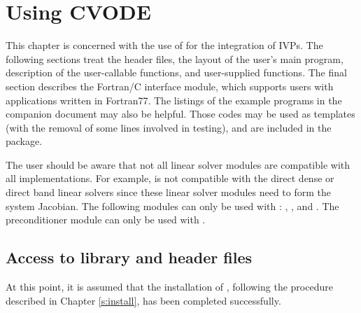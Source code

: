 \chapter{Using CVODE}\label{s:simulation}

This chapter is concerned with the use of {\cvode} for the integration
of IVPs.  The following sections treat the header files, the layout of
the user's main program, description of the {\cvode} user-callable
functions, and user-supplied functions.  The final section describes
the Fortran/C interface module, which supports users with applications
written in Fortran77.  The listings of the example programs in the
companion document \cite{cvode2.2.0_ex} may also be helpful.  Those
codes may be used as templates (with the removal of some lines involved
in testing), and are included in the {\cvode} package.

The user should be aware that not all linear solver modules are compatible 
with all {\nvector} implementations. 
For example, {\nvecp} is not compatible with the direct dense or direct band 
linear solvers since these linear solver modules need to form the system
Jacobian.  The following {\cvode} modules can only be used with {\nvecs}:
{\cvdense}, {\cvband}, and {\cvbandpre}. The preconditioner module {\cvbbdpre}
can only be used with {\nvecp}.

\section{Access to library and header files}\label{ss:file_access}

At this point, it is assumed that the installation of {\cvode},
following the procedure described in Chapter \ref{s:install}, has
been completed successfully.

